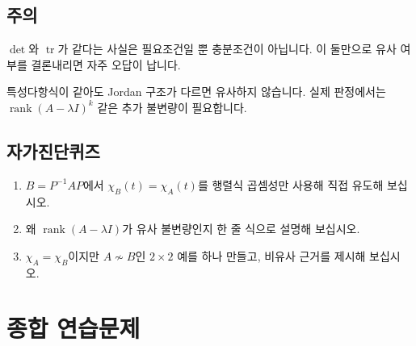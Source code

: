 \subsection*{주의}
\begin{warning}
$\det$와 $\operatorname{tr}$가 같다는 사실은 필요조건일 뿐 충분조건이 아닙니다. 이 둘만으로 유사 여부를 결론내리면 자주 오답이 납니다.
\end{warning}
\begin{warning}
특성다항식이 같아도 Jordan 구조가 다르면 유사하지 않습니다. 실제 판정에서는 $\operatorname{rank}(A-\lambda I)^k$ 같은 추가 불변량이 필요합니다.
\end{warning}

\subsection*{자가진단퀴즈}
\begin{enumerate}[label=\arabic*.]
\item $B=P^{-1}AP$에서 $\chi_B(t)=\chi_A(t)$를 행렬식 곱셈성만 사용해 직접 유도해 보십시오.
\item 왜 $\operatorname{rank}(A-\lambda I)$가 유사 불변량인지 한 줄 식으로 설명해 보십시오.
\item $\chi_A=\chi_B$이지만 $A\not\sim B$인 $2\times2$ 예를 하나 만들고, 비유사 근거를 제시해 보십시오.
\end{enumerate}


\chaptersummarytemplate

\section*{종합 연습문제}

